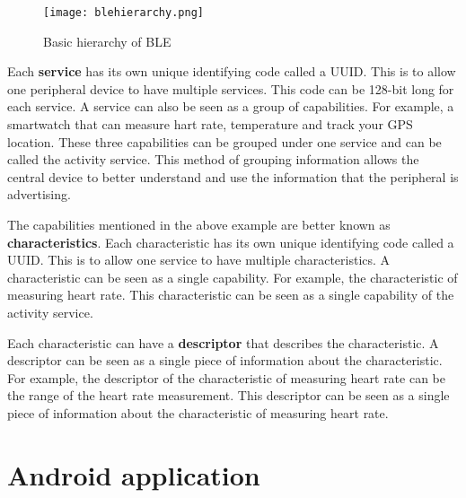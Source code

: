 \begin{figure}[!h]
    \centering
    \texttt{[image: blehierarchy.png]}
    \caption{Basic hierarchy of BLE}
    \label{fig:ble_roles}
\end{figure}

Each \textbf{service} has its own unique identifying code called a UUID. This is to allow one peripheral device to have multiple services. This code can be 128-bit long for each service. A service can also be seen as a group of capabilities. For example, a smartwatch that can measure hart rate, temperature and track your GPS location. These three capabilities can be grouped under one service and can be called the activity service. This method of grouping information allows the central device to better understand and use the information that the peripheral is advertising.

The capabilities mentioned in the above example are better known as \textbf{characteristics}. Each characteristic has its own unique identifying code called a UUID. This is to allow one service to have multiple characteristics. A characteristic can be seen as a single capability. For example, the characteristic of measuring heart rate. This characteristic can be seen as a single capability of the activity service. 

Each characteristic can have a \textbf{descriptor} that describes the characteristic. A descriptor can be seen as a single piece of information about the characteristic. For example, the descriptor of the characteristic of measuring heart rate can be the range of the heart rate measurement. This descriptor can be seen as a single piece of information about the characteristic of measuring heart rate.



\section{Android application}
\label{sec:android}


